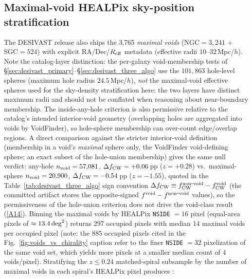 \documentclass[aps,prd,twocolumn,superscriptaddress,showpacs,preprintnumbers,nofootinbib,longbibliography,floatfix]{revtex4-2}
\newcommand{\repoBase}{https://github.com/Hubify-Projects/bigbounce/blob/main}
\begin{document}
\subsection{Maximal-void HEALPix sky-position stratification}\label{sec:desivast_maximal_healpix}

The DESIVAST release also ships the 3,765 \emph{maximal voids}
(NGC$=3{,}241$ + SGC$=524$) with explicit RA/Dec/$R_{\rm eff}$ metadata
(effective radii $10$--$32\,$Mpc/$h$). Note the catalog-layer
distinction: the per-galaxy void-membership tests of
\S\ref{sec:desivast_primary}--\S\ref{sec:desivast_three_algo} use the
$101{,}863$ hole-level spheres (maximum hole radius
$24.5\,$Mpc/$h$), \emph{not} the maximal-void effective spheres used
for the sky-density stratification here; the two layers have distinct
maximum radii and should not be conflated when reasoning about
near-boundary membership. The inside-any-hole criterion is also
permissive relative to the catalog's intended interior-void geometry
(overlapping holes are aggregated into voids by VoidFinder), so
hole-sphere membership can over-count edge/overlap regions. A direct
comparison against the stricter interior-void definition (membership
in a void's \emph{maximal} sphere only, the VoidFinder void-defining
sphere; an exact subset of the hole-union membership) gives the same
null verdict: any-hole $n_{\rm void} = 57{,}081$,
$\Delta f_{\rm CW} = +0.06$\,pp ($z = +0.28$) vs.\ maximal-sphere
$n_{\rm void} = 20{,}900$, $\Delta f_{\rm CW} = -0.54$\,pp
($z = -1.55$), quoted in the
Table~\ref{tab:desivast_three_algo} sign convention
$\Delta f_{\rm CW} \equiv f_{\rm CW}^{\rm non\mbox{-}void} -
f_{\rm CW}^{\rm void}$ (the committed artifact stores the
opposite-signed $f^{\rm void} - f^{\rm non\mbox{-}void}$ values), so
the permissiveness of the hole-union criterion does
not drive the void-class result
(\href{\repoBase/pipelines/p5\_desi\_chirality/outputs/24\_r24conf\_pod\_session.json}{[A14]}). Binning the maximal voids by
HEALPix \texttt{NSIDE} $= 16$ pixel (equal-area pixels of
$\approx 13.4\,{\rm deg}^2$) returns 297 occupied pixels with
median 14 maximal voids per occupied pixel (note: the 885 occupied pixels cited in the Fig.~\ref{fig:voids_vs_chirality} caption refer to the finer \texttt{NSIDE} $= 32$ pixelization of the same void set, which yields more pixels at a smaller median count of 4 voids/pixel). Stratifying the $z \leq
0.24$ matched-spiral subsample by the number of maximal voids in each
spiral's HEALPix pixel produces :
\end{document}
